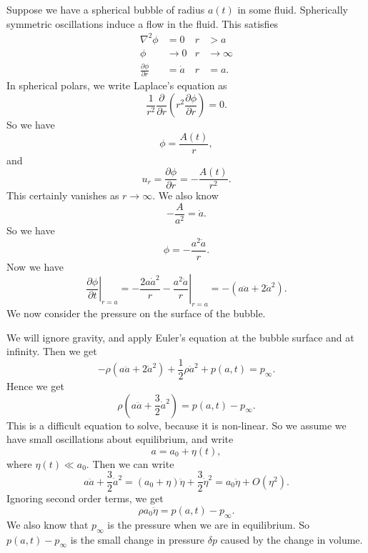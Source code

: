 \documentclass[a4paper]{article}
\begin{document}
\begin{eg}
  Suppose we have a spherical bubble of radius $a(t)$ in some fluid. Spherically symmetric oscillations induce a flow in the fluid. This satisfies
  \begin{align*}
    \nabla^2 \phi &= 0 & r & > a\\
    \phi&\to 0 & r &\to \infty\\
    \frac{\partial \phi}{\partial r} &= \dot{a} & r &= a.
  \end{align*}
  In spherical polars, we write Laplace's equation as
  \[
    \frac{1}{r^2} \frac{\partial}{\partial r} \left(r^2 \frac{\partial \phi}{\partial r}\right) = 0.
  \]
  So we have
  \[
    \phi = \frac{A(t)}{r},
  \]
  and
  \[
    u_r = \frac{\partial \phi}{\partial r} = -\frac{A(t)}{r^2}.
  \]
  This certainly vanishes as $r \to \infty$. We also know
  \[
    -\frac{A}{a^2} = \dot{a}.
  \]
  So we have
  \[
    \phi = -\frac{a^2\dot{a}}{r}.
  \]
  Now we have
  \[
    \left.\frac{\partial \phi}{\partial t}\right|_{r = a} = \left.-\frac{2a\dot{a}^2}{r} -\frac{a^2\ddot{a}}{r}\right|_{r = a} = -(a\ddot{a} + 2\dot{a}^2).
  \]
  We now consider the pressure on the surface of the bubble.

  We will ignore gravity, and apply Euler's equation at the bubble surface and at infinity. Then we get
  \[
    -\rho (a\ddot{a} + 2 \dot{a}^2) + \frac{1}{2}\rho \dot{a}^2 + p(a, t) = p_\infty.
  \]
  Hence we get
  \[
    \rho\left(a\ddot{a} + \frac{3}{2}\dot{a}^2\right) = p(a, t) - p_\infty.
  \]
  This is a difficult equation to solve, because it is non-linear. So we assume we have small oscillations about equilibrium, and write
  \[
    a = a_0 + \eta(t),
  \]
  where $\eta(t) \ll a_0$. Then we can write
  \[
    a\ddot{a} + \frac{3}{2} \dot{a}^2 = (a_0 + \eta) \ddot{\eta} + \frac{3}{2} \dot{\eta}^2 = a_0 \ddot{\eta} + O(\eta^2).
  \]
  Ignoring second order terms, we get
  \[
    \rho a_0 \ddot{\eta} = p(a, t) - p_\infty.
  \]
  We also know that $p_\infty$ is the pressure when we are in equilibrium. So $p(a, t) - p_\infty$ is the small change in pressure $\delta p$ caused by the change in volume.


\end{eg}
\end{document}
